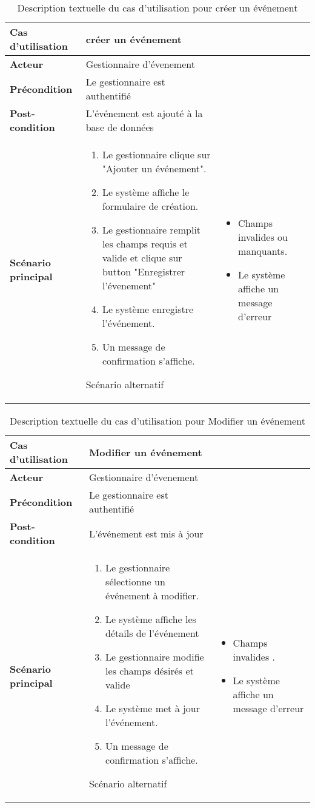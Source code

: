 \begin{longtable}{|>{\bfseries}p{4cm}|p{10cm}|}
\hline
Cas d’utilisation & créer un événement \\
\hline
Acteur & Gestionnaire d'évenement \\
\hline
Précondition & Le gestionnaire est authentifié \\
\hline
Post-condition & L’événement est ajouté à la base de données \\
\hline
Scénario principal & 
\begin{enumerate}
  \item Le gestionnaire clique sur "Ajouter un événement".
  \item Le système affiche le formulaire de création.
  \item  Le gestionnaire remplit les champs requis et valide et clique sur button "Enregistrer l'évenement"
  \item Le système enregistre l’événement.
  \item  Un message de confirmation s’affiche.

\end{enumerate} 
\hline
Scénario alternatif & 
\begin{itemize}
  \item Champs invalides ou manquants.
  \item Le système affiche un message d’erreur
\end{itemize} 
\hline
\caption{Description textuelle du cas d’utilisation pour créer un événement}
\end{longtable}


\begin{longtable}{|>{\bfseries}p{4cm}|p{10cm}|}
\hline
Cas d’utilisation & Modifier un événement \\
\hline
Acteur & Gestionnaire d'évenement \\
\hline
Précondition & Le gestionnaire est authentifié \\
\hline
Post-condition & L’événement est mis à jour \\
\hline
Scénario principal & 
\begin{enumerate}
  \item Le gestionnaire sélectionne un événement à modifier.
  \item Le système affiche les détails de l’événement
  \item  Le gestionnaire modifie les champs désirés et valide
  \item Le système met à jour l’événement.
  \item Un message de confirmation s’affiche.
\end{enumerate} 
\hline
Scénario alternatif & 
\begin{itemize}
  \item Champs invalides .
  \item Le système affiche un message d’erreur
\end{itemize} 
\hline
\caption{Description textuelle du cas d’utilisation pour  Modifier un événement}
\end{longtable}


